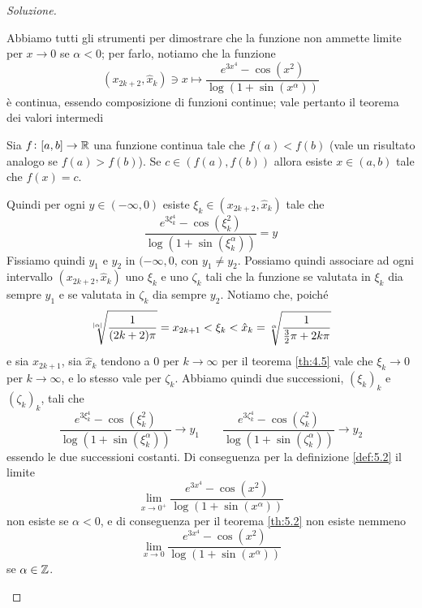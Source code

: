 \begin{proof}[Soluzione]
\begin{enumerate}[(i)]
\begin{center}
    \end{center}
        Abbiamo tutti gli strumenti per dimostrare che la funzione non ammette limite per $x\to 0$ se $\alpha<0$; per farlo, notiamo che la funzione
        \[
        (x_{2k+2}, \hat{x}_k) \ni x\mapsto \frac{e^{3x^4}-\cos(x^2)}{\log(1+\sin(x^\alpha))}
        \]
        è continua, essendo composizione di funzioni continue; vale pertanto il teorema dei valori intermedi
        \begin{tcolorbox}
            \begin{theorem}
                \label{th:5.3}
                Sia $f\colon [a,b]\to \amsbb{R}$ una funzione continua tale che $f(a)<f(b)$ (vale un risultato analogo se $f(a)>f(b)$). Se $c\in(f(a), f(b))$ allora esiste $x\in(a,b)$ tale che $f(x)=c$.
            \end{theorem}
        \end{tcolorbox}
        Quindi per ogni $y\in(-\infty, 0)$ esiste $\xi_k\in(x_{2k+2}, \hat{x}_k)$ tale che
        \[
        \frac{e^{3\xi_k^4}-\cos(\xi_k^2)}{\log(1+\sin(\xi_k^\alpha))} = y
        \]
        Fissiamo quindi $y_1$ e $y_2$ in $(-\infty, 0$, con $y_1 \ne y_2$. Possiamo quindi associare ad ogni intervallo $(x_{2k+2}, \hat{x}_k)$ uno $\xi_k$ e uno $\zeta_k$ tali che la funzione se valutata in $\xi_k$ dia sempre $y_1$ e se valutata in $\zeta_k$ dia sempre $y_2$. Notiamo che, poiché
        \[
        \sqrt[\abs{\alpha}]{\frac{1}{(2k+2)\pi}} = x_{2k+1}<\xi_k<\hat{x}_k =\sqrt[\alpha]{\frac{1}{\frac{3}{2}\pi + 2k\pi}}
        \]
        e sia $x_{2k+1}$, sia $\hat{x}_k$ tendono a 0 per $k\to \infty$ per il teorema \ref{th:4.5} vale che $\xi_k \to 0$ per $k\to\infty$, e lo stesso vale per $\zeta_k$. Abbiamo quindi due successioni, $(\xi_k)_k$ e $(\zeta_k)_k$, tali che
        \[
        \frac{e^{3\xi_k^4}-\cos(\xi_k^2)}{\log(1+\sin(\xi_k^\alpha))} \to y_1 \qquad \frac{e^{3\zeta_k^4}-\cos(\zeta_k^2)}{\log(1+\sin(\zeta_k^\alpha))} \to y_2
        \]
        essendo le due successioni costanti. Di conseguenza per la definizione \ref{def:5.2} il limite 
        \[
        \lim_{x\to 0^+} \frac{e^{3x^4}-\cos(x^2)}{\log(1+\sin(x^\alpha))}
        \]
        non esiste se $\alpha<0$, e di conseguenza per il teorema \ref{th:5.2} non esiste nemmeno
        \[
        \lim_{x\to 0} \frac{e^{3x^4}-\cos(x^2)}{\log(1+\sin(x^\alpha))}
        \]
        se $\alpha\in\amsbb{Z}$.
    \end{enumerate}
\end{proof}
